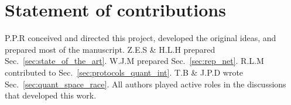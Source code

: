 %
%

\section*{Statement of contributions}

P.P.R conceived and directed this project, developed the original ideas, and prepared most of the manuscript. Z.E.S \& H.L.H prepared Sec.~\ref{sec:state_of_the_art}. W.J.M prepared Sec.~\ref{sec:rep_net}. R.L.M contributed to Sec.~\ref{sec:protocols_quant_int}. T.B \& J.P.D wrote Sec.~\ref{sec:quant_space_race}. All authors played active roles in the discussions that developed this work.
